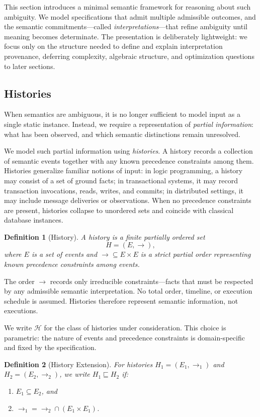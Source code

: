 \documentclass[acmsmall,nonacm]{acmart}
\newtheorem{definition}{Definition}
\theoremstyle{remark}
\numberwithin{definition}{section}
\numberwithin{theorem}{section}
\numberwithin{lemma}{section}
\numberwithin{corollary}{section}
\numberwithin{remark}{section}
\numberwithin{example}{section}
\numberwithin{observation}{section}
\numberwithin{assumption}{section}
\newcommand{\Hist}{\mathcal{H}}
\begin{document}
This section introduces a minimal semantic framework for reasoning about such
ambiguity.
We model specifications that admit multiple admissible outcomes, and the
semantic commitments—called \emph{interpretations}—that refine ambiguity until
meaning becomes determinate.
The presentation is deliberately lightweight: we focus only on the structure
needed to define and explain interpretation provenance, deferring complexity,
algebraic structure, and optimization questions to later sections.

\subsection{Histories}

When semantics are ambiguous, it is no longer sufficient to model input as a
single static instance.
Instead, we require a representation of \emph{partial information}: what has
been observed, and which semantic distinctions remain unresolved.

We model such partial information using \emph{histories}.
A history records a collection of semantic events together with any known
precedence constraints among them.
Histories generalize familiar notions of input:
in logic programming, a history may consist of a set of ground facts;
in transactional systems, it may record transaction invocations, reads, writes,
and commits; in distributed settings, it may include message deliveries or
observations.
When no precedence constraints are present, histories collapse to unordered
sets and coincide with classical database instances.

\begin{definition}[History]
A \emph{history} is a finite partially ordered set
\[
  H = (E, \rightarrow),
\]
where $E$ is a set of events and $\rightarrow \subseteq E \times E$ is a strict
partial order representing known precedence constraints among events.
\end{definition}

The order $\rightarrow$ records only irreducible constraints—facts that must be
respected by any admissible semantic interpretation.
No total order, timeline, or execution schedule is assumed.
Histories therefore represent semantic information, not executions.

We write $\Hist$ for the class of histories under consideration.
This choice is parametric: the nature of events and precedence constraints is
domain-specific and fixed by the specification.

\begin{definition}[History Extension]
For histories $H_1=(E_1,\rightarrow_1)$ and $H_2=(E_2,\rightarrow_2)$, we write
$H_1 \sqsubseteq H_2$ if:
\begin{enumerate}
  \item $E_1 \subseteq E_2$, and
  \item $\rightarrow_1 = \rightarrow_2 \cap (E_1 \times E_1)$.
\end{enumerate}
\end{definition}
\end{document}
